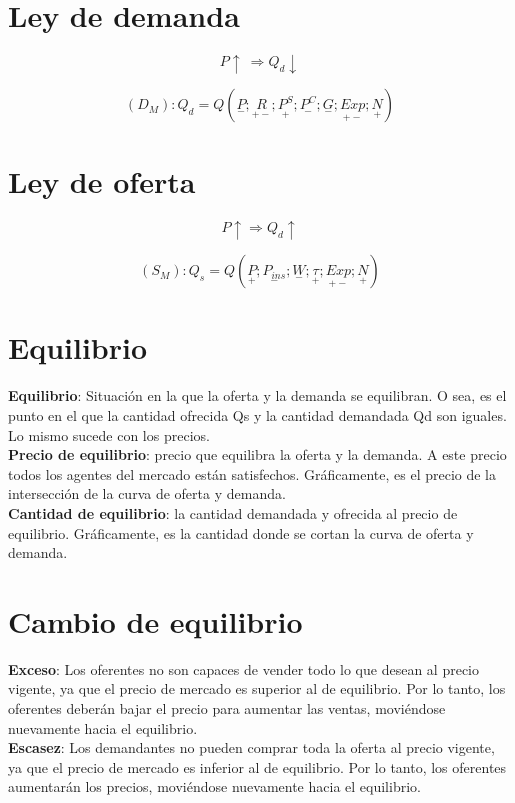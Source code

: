 \documentclass{report}
\begin{document}
\section{Ley de demanda}

\[ P \uparrow ~ \Rightarrow Q_d \downarrow \]

\[
	(D_M): Q_d = Q(\underset{-}{P};\underset{+-}{R};\underset{+}{P^S};\underset{-}{P^C};\underset{-}{G};\underset{+-}{Exp};\underset{+}{N})
\]
\section{Ley de oferta}

\[
	P \uparrow \Rightarrow Q_d \uparrow
\]

\[
	(S_M): Q_s = Q(\underset{+}{P};\underset{-}{P_{ins}};\underset{-}{W};\underset{+}{\tau};\underset{+-}{Exp};\underset{+}{N})
\]

\section{Equilibrio}

\textbf{Equilibrio}: Situación en la que la oferta y la demanda se equilibran. O sea, es el punto en el que la cantidad ofrecida Qs y la cantidad demandada Qd son iguales. Lo mismo sucede con los precios. \\

\textbf{Precio de equilibrio}: precio que equilibra la oferta y la demanda. A este precio todos los agentes del mercado están satisfechos. Gráficamente, es el precio de la intersección de la curva de oferta y demanda. \\

\textbf{Cantidad de equilibrio}: la cantidad demandada y ofrecida al precio de equilibrio. Gráficamente, es la cantidad donde se cortan la curva de oferta y demanda. \\

\section{Cambio de equilibrio}

\textbf{Exceso}: Los oferentes no son capaces de vender todo lo que desean al precio vigente, ya que el precio de mercado es superior al de equilibrio. Por lo tanto, los oferentes deberán bajar el precio para aumentar las ventas, moviéndose nuevamente hacia el equilibrio. \\

\textbf{Escasez}: Los demandantes no pueden comprar toda la oferta al precio vigente, ya que el precio de mercado es inferior al de equilibrio. Por lo tanto, los oferentes aumentarán los precios, moviéndose nuevamente hacia el equilibrio. \\
\end{document}
